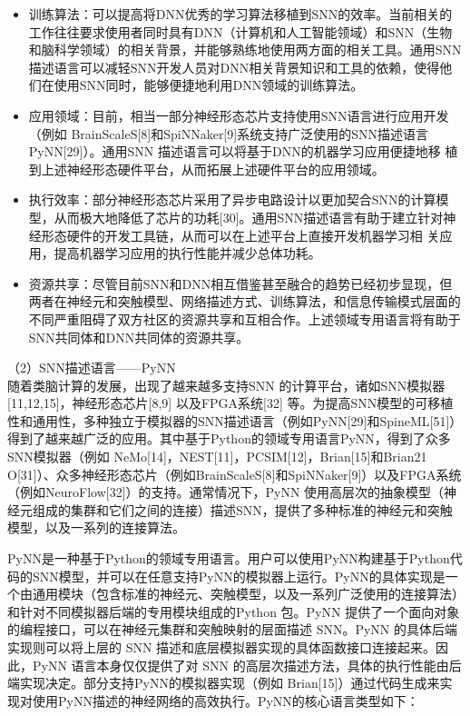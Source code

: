 \begin{itemize}
    \item 训练算法：可以提高将DNN优秀的学习算法移植到SNN的效率。当前相关的工作往往要求使用者同时具有DNN（计算机和人工智能领域）和SNN（生物和脑科学领域）的相关背景，并能够熟练地使用两方面的相关工具。通用SNN描述语言可以减轻SNN开发人员对DNN相关背景知识和工具的依赖，使得他们在使用SNN同时，能够便捷地利用DNN领域的训练算法。
    \item 应用领域：目前，相当一部分神经形态芯片支持使用SNN语言进行应用开发（例如 BrainScaleS[8]和SpiNNaker[9]系统支持广泛使用的SNN描述语言PyNN[29]）。通用SNN 描述语言可以将基于DNN的机器学习应用便捷地移 植到上述神经形态硬件平台，从而拓展上述硬件平台的应用领域。 
    \item 执行效率：部分神经形态芯片采用了异步电路设计以更加契合SNN的计算模型，从而极大地降低了芯片的功耗[30]。通用SNN描述语言有助于建立针对神经形态硬件的开发工具链，从而可以在上述平台上直接开发机器学习相 关应用，提高机器学习应用的执行性能并减少总体功耗。 
    \item 资源共享：尽管目前SNN和DNN相互借鉴甚至融合的趋势已经初步显现，但两者在神经元和突触模型、网络描述方式、训练算法，和信息传输模式层面的不同严重阻碍了双方社区的资源共享和互相合作。上述领域专用语言将有助于SNN共同体和DNN共同体的资源共享。

\end{itemize}

（2）SNN描述语言——PyNN\\

随着类脑计算的发展，出现了越来越多支持SNN 的计算平台，诸如SNN模拟器[11,12,15]，神经形态芯片[8,9] 以及FPGA系统[32] 等。为提高SNN模型的可移植性和通用性，多种独立于模拟器的SNN描述语言（例如PyNN[29]和SpineML[51]）得到了越来越广泛的应用。其中基于Python的领域专用语言PyNN，得到了众多 SNN模拟器（例如 NeMo[14]，NEST[11]，PCSIM[12]，Brian[15]和Brian21 O[31]）、众多神经形态芯片（例如BrainScaleS[8]和SpiNNaker[9]）以及FPGA系统（例如NeuroFlow[32]）的支持。通常情况下，PyNN 使用高层次的抽象模型（神经元组成的集群和它们之间的连接）描述SNN，提供了多种标准的神经元和突触模型，以及一系列的连接算法。

PyNN是一种基于Python的领域专用语言。用户可以使用PyNN构建基于Python代码的SNN模型，并可以在任意支持PyNN的模拟器上运行。PyNN的具体实现是一个由通用模块（包含标准的神经元、突触模型，以及一系列广泛使用的连接算法）和针对不同模拟器后端的专用模块组成的Python 包。PyNN 提供了一个面向对象的编程接口，可以在神经元集群和突触映射的层面描述 SNN。PyNN 的具体后端实现则可以将上层的 SNN 描述和底层模拟器实现的具体函数接口连接起来。因此，PyNN 语言本身仅仅提供了对 SNN 的高层次描述方法，具体的执行性能由后端实现决定。部分支持PyNN的模拟器实现（例如 Brian[15]）通过代码生成来实现对使用PyNN描述的神经网络的高效执行。PyNN的核心语言类型如下：


